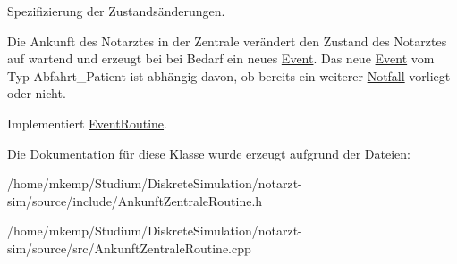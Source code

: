 Spezifizierung der Zustandsänderungen. 

Die Ankunft des Notarztes in der Zentrale verändert den Zustand des Notarztes auf wartend und erzeugt bei bei Bedarf ein neues \hyperlink{classEvent}{Event}. Das neue \hyperlink{classEvent}{Event} vom Typ Abfahrt\+\_\+\+Patient ist abhängig davon, ob bereits ein weiterer \hyperlink{classNotfall}{Notfall} vorliegt oder nicht. 

Implementiert \hyperlink{classEventRoutine_aede9b0fdb576a4a262ced2d7d6548c14}{Event\+Routine}.



Die Dokumentation für diese Klasse wurde erzeugt aufgrund der Dateien\+:\begin{DoxyCompactItemize}
\item 
/home/mkemp/\+Studium/\+Diskrete\+Simulation/notarzt-\/sim/source/include/Ankunft\+Zentrale\+Routine.\+h\item 
/home/mkemp/\+Studium/\+Diskrete\+Simulation/notarzt-\/sim/source/src/Ankunft\+Zentrale\+Routine.\+cpp\end{DoxyCompactItemize}
